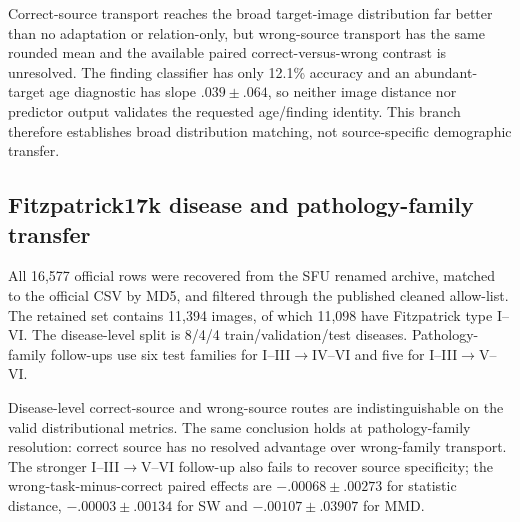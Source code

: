 Correct-source transport reaches the broad target-image distribution far better than no adaptation or relation-only, but wrong-source transport has the same rounded mean and the available paired correct-versus-wrong contrast is unresolved. The finding classifier has only 12.1\% accuracy and an abundant-target age diagnostic has slope $.039\pm.064$, so neither image distance nor predictor output validates the requested age/finding identity. This branch therefore establishes broad distribution matching, not source-specific demographic transfer.

\subsection{Fitzpatrick17k disease and pathology-family transfer}
All 16,577 official rows were recovered from the SFU renamed archive, matched to the official CSV by MD5, and filtered through the published cleaned allow-list. The retained set contains 11,394 images, of which 11,098 have Fitzpatrick type I--VI. The disease-level split is 8/4/4 train/validation/test diseases. Pathology-family follow-ups use six test families for I--III$\rightarrow$IV--VI and five for I--III$\rightarrow$V--VI.

\begin{table}[h]
\centering\scriptsize
\caption{Fitzpatrick zero-target route means. Invalidated phenotype/semantic instruments are omitted here; statistic distance, SW and energy MMD are lower-is-better.}
\end{table}

Disease-level correct-source and wrong-source routes are indistinguishable on the valid distributional metrics. The same conclusion holds at pathology-family resolution: correct source has no resolved advantage over wrong-family transport. The stronger I--III$\rightarrow$V--VI follow-up also fails to recover source specificity; the wrong-task-minus-correct paired effects are $-.00068\pm.00273$ for statistic distance, $-.00003\pm.00134$ for SW and $-.00107\pm.03907$ for MMD.

